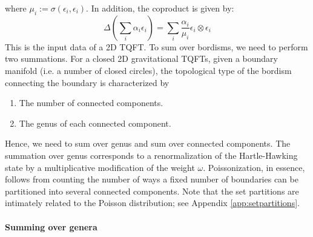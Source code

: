 \documentclass[a4paper,11pt]{article}
\theoremstyle{definition}
\numberwithin{equation}{section}
\begin{document}
where $\mu_i:=\sigma(\epsilon_i,\epsilon_i)$. In addition, the coproduct is given by:
\begin{equation}
    \Delta(\sum_i\alpha_i\epsilon_i) = \sum_i\frac{\alpha_i}{\mu_i}\epsilon_i\otimes\epsilon_i
\end{equation}
This is the input data of a 2D TQFT. To sum over bordisms, we need to perform two summations. For a closed 2D gravitational TQFTs, given a boundary manifold (i.e. a number of closed circles), the topological type of the bordism connecting the boundary is characterized by 
\begin{enumerate}
    \item The number of connected components.
    \item The genus of each connected component.
\end{enumerate}
Hence, we need to sum over genus and sum over connected components. The summation over genus corresponds to a renormalization of the Hartle-Hawking state by a multiplicative modification of the weight $\omega$. Poissonization, in essence, follows from counting the number of ways a fixed number of boundaries can be partitioned into several connected components. Note that the set partitions are intimately related to the Poisson distribution; see Appendix \ref{app:setpartitions}.

\paragraph{Summing over genera}
\end{document}
